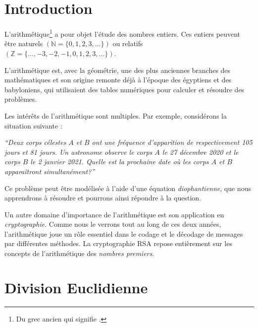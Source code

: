 \section{Introduction}
L'arithmétique\footnote{Du grec ancien  qui signifie .} a pour objet l'étude des nombres entiers.
Ces entiers peuvent être naturels $(\mathbb{N}=\{0,1,2,3, \ldots\})$ ou relatifs $(\mathbb{Z}=\{\ldots,-3,-2,-1,0,1,2,3, \ldots\})$.

\smallskip

L'arithmétique est, avec la géométrie, une des plus anciennes branches des mathématiques et son origine remonte déjà à l'époque des égyptiens et des babyloniens, qui utilisaient des tables numériques pour calculer et résoudre des problèmes.


\smallskip
Les intérêts de l'arithmétique sont multiples. Par exemple, considérons la situation suivante :
\begin{center}\begin{minipage}[t]{0.85\textwidth}\begin{center}
\textit{``Deux corps célestes $A$ et $B$ ont une fréquence d'apparition de respectivement 105 jours et 81 jours. Un astronome observe le corps $A$ le 27 décembre 2020 et le corps $B$ le 2 janvier 2021. Quelle est la prochaine date où les corps $A$ et $B$ apparaîtront simultanément?''}
\end{center}\end{minipage}\end{center}

Ce problème peut être modélisée à l'aide d'une équation \textit{diophantienne}, que nous apprendrons à résoudre et pourrons ainsi répondre à la question.

\smallskip
Un autre domaine d'importance de l'arithmétique est son application en \textit{cryptographie}. Comme nous le verrons tout au long de ces deux années, l'arithmétique joue un rôle essentiel dans le codage et le décodage de messages par différentes méthodes. La cryptographie RSA repose entièrement sur les concepts de l'arithmétique des \textit{nombres premiers}.


\section{Division Euclidienne}
